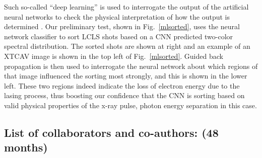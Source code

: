 Such so-called ``deep learning'' is used to interrogate the output of the artificial neural networks to check the physical interpretation of how the output is determined \cite{Mihir}.
Our preliminary test, shown in Fig.~\ref{mlsorted}, uses the neural network classifier to sort LCLS shots based on a CNN predicted two-color spectral distribution.
The sorted shots are shown at right and an example of an XTCAV image is shown in the top left of Fig.~\ref{mlsorted}.
Guided back propagation is then used to interrogate the neural network about which regions of that image influenced the sorting most strongly, and this is shown in the lower left.
These two regions indeed indicate the loss of electron energy due to the lasing process, thus boosting our confidence that the CNN is sorting based on valid physical properties of the x-ray pulse, photon energy separation in this case.

\subsection*{List of collaborators and co-authors: (48 months)}


